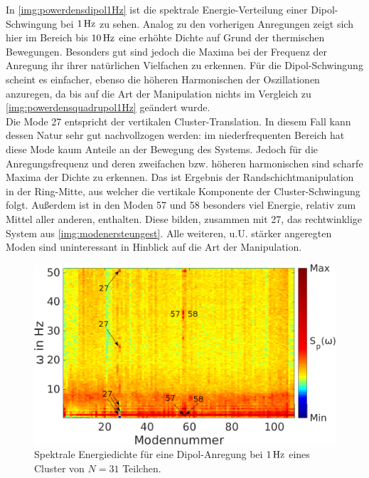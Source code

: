\documentclass[numbers=noenddot,a4paper,notitlepage,twoside,BCOR15mm]{scrbook}
\begin{document}
							In \autoref{img:powerdensdipol1Hz} ist die spektrale Energie-Verteilung einer Dipol-Schwingung bei $\unit[1]{Hz}$ zu sehen. Analog zu den vorherigen Anregungen zeigt sich hier im Bereich bis $\unit[10]{Hz}$ eine erhöhte Dichte auf Grund der thermischen Bewegungen. Besonders gut sind jedoch die Maxima bei der Frequenz der Anregung ihr ihrer natürlichen Vielfachen zu erkennen. Für die Dipol-Schwingung scheint es einfacher, ebenso die höheren Harmonischen der Oszillationen anzuregen, da bis auf die Art der Manipulation nichts im Vergleich zu \autoref{img:powerdensquadrupol1Hz} geändert wurde.\\
							Die Mode 27 entspricht der vertikalen Cluster-Translation. In diesem Fall kann dessen Natur sehr gut nachvollzogen werden: im niederfrequenten Bereich hat diese Mode kaum Anteile an der Bewegung des Systems. Jedoch für die Anregungsfrequenz und deren zweifachen bzw. höheren harmonischen sind scharfe Maxima der Dichte zu erkennen. Das ist Ergebnis der Randschichtmanipulation in der Ring-Mitte, aus welcher die vertikale Komponente der Cluster-Schwingung folgt. Außerdem ist in den Moden 57 und 58 besonders viel Energie, relativ zum Mittel aller anderen, enthalten. Diese bilden, zusammen mit 27, das rechtwinklige System aus \autoref{img:modenersteungest}. Alle weiteren, u.U. stärker angeregten Moden sind uninteressant in Hinblick auf die Art der Manipulation.

								\begin{figure}[!t]
									\centering
									\includegraphics[width=\textwidth,height=0.5\textwidth]{figs/auswertung/manipulation/dipol1Hzpowerdens.png}
									\caption{Spektrale Energiedichte für eine Dipol-Anregung  bei $\unit[1]{Hz}$ eines Cluster von $N=31$ Teilchen.}\label{img:powerdensdipol1Hz}
									\vspace{-0.5cm}
								\end{figure}
\end{document}
